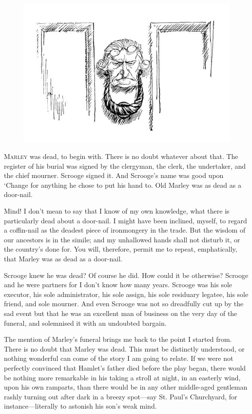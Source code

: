 \documentclass[paper=5.5in:8.5in,BCOR=15mm,twoside,DIV=15,headinclude=off,12pt,chapterprefix=off,openany,headings=huge]{scrbook} %
\begin{document}
\renewcommand*{\chaptermarkformat}{}
\begin{figure}[h]
\centering
\includegraphics[width=0.8\linewidth]{gs016}
\end{figure}
\lettrine[loversize=.85]{M}{arley} was dead, to begin with. There is no doubt whatever about that. The register of his burial was signed by the clergyman, the clerk, the undertaker, and the chief mourner. Scrooge signed it. And Scrooge's name was good upon `Change for anything he chose to put his hand to. Old Marley was as dead as a door-nail.

Mind! I don't mean to say that I know of my own knowledge, what there is particularly dead about a door-nail. I might have been inclined, myself, to regard a coffin-nail as the deadest piece of ironmongery in the trade. But the wisdom of our ancestors is in the simile; and my unhallowed hands shall not disturb it, or the country's done for. You will, therefore, permit me to repeat, emphatically, that Marley was as dead as a door-nail.

Scrooge knew he was dead? Of course he did. How could it be otherwise? Scrooge and he were partners for I don't know how many years. Scrooge was his sole executor, his sole administrator, his sole assign, his sole residuary legatee, his sole friend, and sole mourner. And even Scrooge was not so dreadfully cut up by the sad event but that he was an excellent man of business on the very day of the funeral, and solemnised it with an undoubted bargain.

The mention of Marley's funeral brings me back to the point I started from. There is no doubt that Marley was dead. This must be distinctly understood, or nothing wonderful can come of the story I am going to relate. If we were not perfectly convinced that Hamlet's father died before the play began, there would be nothing more remarkable in his taking a stroll at night, in an easterly wind, upon his own ramparts, than there would be in any other middle-aged gentleman rashly turning out after dark in a breezy spot—say St. Paul's Churchyard, for instance—literally to astonish his son's weak mind.
\end{document}
